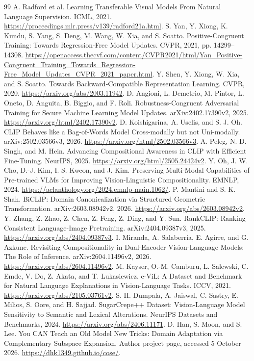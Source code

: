 \documentclass[11pt]{article}
\begin{document}
\begin{thebibliography}{99}
 A. Radford et al.
Learning Transferable Visual Models From Natural Language Supervision.
ICML, 2021. \url{https://proceedings.mlr.press/v139/radford21a.html}.
 S. Yan, Y. Xiong, K. Kundu, S. Yang, S. Deng, M. Wang,
W. Xia, and S. Soatto.
Positive-Congruent Training: Towards Regression-Free Model Updates.
CVPR, 2021, pp. 14299--14308.
\url{https://openaccess.thecvf.com/content/CVPR2021/html/Yan_Positive-Congruent_Training_Towards_Regression-Free_Model_Updates_CVPR_2021_paper.html}.
 Y. Shen, Y. Xiong, W. Xia, and S. Soatto.
Towards Backward-Compatible Representation Learning. CVPR, 2020.
\url{https://arxiv.org/abs/2003.11942}.
 D. Angioni, L. Demetrio, M. Pintor, L. Oneto, D. Anguita,
B. Biggio, and F. Roli.
Robustness-Congruent Adversarial Training for Secure Machine Learning Model
Updates. arXiv:2402.17390v2, 2025.
\url{https://arxiv.org/html/2402.17390v2}.
 D. Koishigarina, A. Uselis, and S. J. Oh.
CLIP Behaves like a Bag-of-Words Model Cross-modally but not Uni-modally.
arXiv:2502.03566v3, 2026. \url{https://arxiv.org/html/2502.03566v3}.
 A. Peleg, N. D. Singh, and M. Hein.
Advancing Compositional Awareness in CLIP with Efficient Fine-Tuning.
NeurIPS, 2025. \url{https://arxiv.org/html/2505.24424v2}.
 Y. Oh, J. W. Cho, D.-J. Kim, I. S. Kweon, and J. Kim.
Preserving Multi-Modal Capabilities of Pre-trained VLMs for Improving
Vision-Linguistic Compositionality. EMNLP, 2024.
\url{https://aclanthology.org/2024.emnlp-main.1062/}.
 P. Mantini and S. K. Shah.
BiCLIP: Domain Canonicalization via Structured Geometric Transformation.
arXiv:2603.08942v2, 2026. \url{https://arxiv.org/abs/2603.08942v2}.
 Y. Zhang, Z. Zhao, Z. Chen, Z. Feng, Z. Ding, and Y. Sun.
RankCLIP: Ranking-Consistent Language-Image Pretraining.
arXiv:2404.09387v3, 2025. \url{https://arxiv.org/abs/2404.09387v3}.
 I. Miranda, A. Salaberria, E. Agirre, and G. Azkune.
Revisiting Compositionality in Dual-Encoder Vision-Language Models:
The Role of Inference. arXiv:2604.11496v2, 2026.
\url{https://arxiv.org/abs/2604.11496v2}.
 M. Kayser, O.-M. Camburu, L. Salewski, C. Emde, V. Do,
Z. Akata, and T. Lukasiewicz.
e-ViL: A Dataset and Benchmark for Natural Language Explanations in
Vision-Language Tasks. ICCV, 2021. \url{https://arxiv.org/abs/2105.03761v2}.
 S. H. Dumpala, A. Jaiswal, C. Sastry, E. Milios,
S. Oore, and H. Sajjad.
SugarCrepe++ Dataset: Vision-Language Model Sensitivity to Semantic and
Lexical Alterations. NeurIPS Datasets and Benchmarks, 2024.
\url{https://arxiv.org/abs/2406.11171}.
 D. Han, S. Moon, and S. Lee.
You CAN Teach an Old Model New Tricks: Domain Adaptation via
Complementary Subspace Expansion. Author project page, accessed
5 October 2026. \url{https://dhk1349.github.io/cose/}.
\end{thebibliography}
\end{document}
